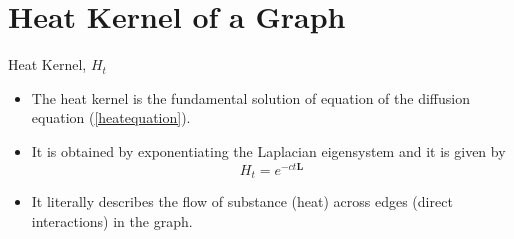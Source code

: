 \documentclass{beamer}
\begin{document}
\section{Heat Kernel of a Graph}
\begin{frame}{Heat Kernel, $H_t$}
	\begin{block}{}
		\begin{itemize}
			\item The heat kernel is the fundamental solution of equation of the diffusion equation (\ref{heatequation}). 
			\vspace{0.5cm}
			\pause
            \item It is obtained by exponentiating the Laplacian eigensystem and it is given by
			\begin{equation}
			H_t = e^{-c t \mathbf{L}} 
			\end{equation} 
			\vspace{0.5cm}
			\pause
			\item It literally describes the flow of substance (heat) across edges (direct interactions) in the graph.
		\end{itemize}
	\end{block}
\end{frame}
\end{document}
